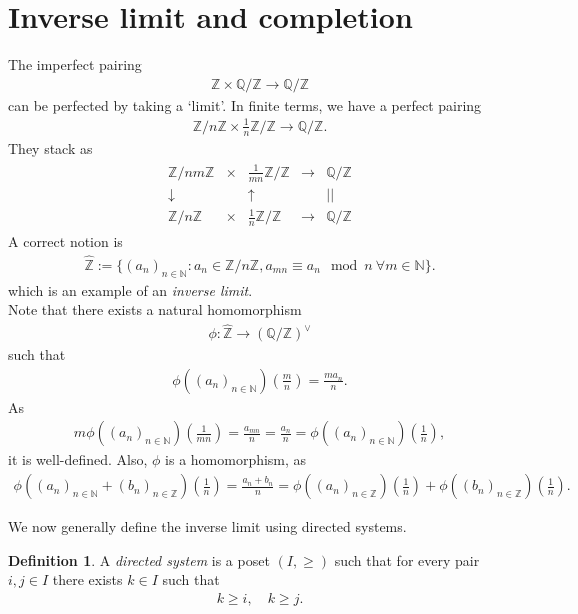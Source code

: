 \documentclass[12pt]{report}
\theoremstyle{plain}
\theoremstyle{remark}
\theoremstyle{definition}
\newtheorem{definition}[theorem]{Definition}
\newcommand{\N}{\mathbb{N}}
\newcommand{\Z}{\mathbb{Z}}
\newcommand{\Q}{\mathbb{Q}}
\begin{document}
\section{Inverse limit and completion}
The imperfect pairing
\begin{align*}
    \Z\times \Q/\Z\rightarrow \Q/\Z
\end{align*}
can be perfected by taking a `limit'. In finite terms, we have a perfect pairing
\begin{align*}
    \Z/n\Z\times \frac{1}{n}\Z/\Z \rightarrow \Q/\Z.
\end{align*}
They stack as
\begin{align*}
    \begin{matrix}
        \Z/nm\Z & \times & \frac{1}{mn}\Z/\Z & \rightarrow & \Q/\Z \\
        \downarrow & & \uparrow & & || \\
        \Z/n\Z & \times & \frac{1}{n}\Z/\Z & \rightarrow & \Q/\Z
    \end{matrix}
\end{align*}
A correct notion is
\begin{align*}
    \hat{\Z}:= \{(a_n)_{n\in \N}:a_n\in \Z/n\Z,a_{mn}\equiv a_n\mod n\ \forall m\in \N\}.
\end{align*}
which is an example of an \emph{inverse limit}. \\

Note that there exists a natural homomorphism
\begin{align*}
    \phi:\hat{\Z}\rightarrow (\Q/\Z)^\vee
\end{align*}
such that
\begin{align*}
    \phi((a_n)_{n\in \N})\left(\frac{m}{n}\right) = \frac{ma_n}{n}.
\end{align*}
As
\begin{align*}
    m\phi((a_n)_{n\in \N})\left(\frac{1}{mn}\right) = \frac{a_{mn}}{n} = \frac{a_n}{n} = \phi((a_n)_{n\in \N})\left(\frac{1}{n}\right),
\end{align*}
it is well-defined. Also, $\phi$ is a homomorphism, as
\begin{align*}
    \phi((a_n)_{n\in\N} + (b_n)_{n\in\Z})\left(\frac{1}{n}\right) = \frac{a_n+b_n}{n} = \phi((a_n)_{n\in \Z})\left(\frac{1}{n}\right) + \phi((b_n)_{n\in \Z})\left(\frac{1}{n}\right).
\end{align*}

We now generally define the inverse limit using directed systems.

\begin{definition}
    A \emph{directed system} is a poset $(I,\ge)$ such that for every pair $i,j\in I$ there exists $k\in I$ such that
    \begin{align*}
        k\ge i,\quad k\ge j.
    \end{align*}
\end{definition}
\end{document}
